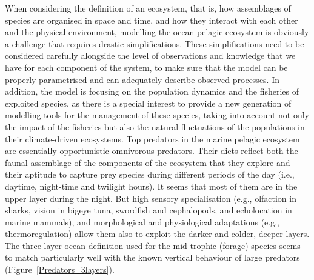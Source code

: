 When considering the definition of an ecosystem, that is, how assemblages of species are organised in space and time, and how they interact with each other and the physical environment, modelling the ocean pelagic ecosystem is obviously a challenge that requires drastic simplifications. These simplifications need to be considered carefully alongside the level of observations and knowledge that we have for each component of the system, to make sure that the model can be properly parametrised and can adequately describe observed processes. In addition, the model is focusing on the population dynamics and the fisheries of exploited species, as there is a special interest to provide a new generation of modelling tools for the management of these species, taking into account not only the impact of the fisheries but also the natural fluctuations of the populations in their climate-driven ecosystems. Top predators in the marine pelagic ecosystem are essentially opportunistic omnivorous predators. Their diets reflect both the faunal assemblage of the components of the ecosystem that they explore and their aptitude to capture prey species during different periods of the day (i.e., daytime, night-time and twilight hours). It seems that most of them are in the upper layer during the night. But high sensory specialisation (e.g., olfaction in sharks, vision in bigeye tuna, swordfish and cephalopods, and echolocation in marine mammals), and morphological and physiological adaptations (e.g., thermoregulation) allow them also to exploit the darker and colder, deeper layers. The three-layer ocean definition used for the mid-trophic (forage) species seems to match particularly well with the known vertical behaviour of large predators (Figure~\ref{Predators_3layers}). \\


